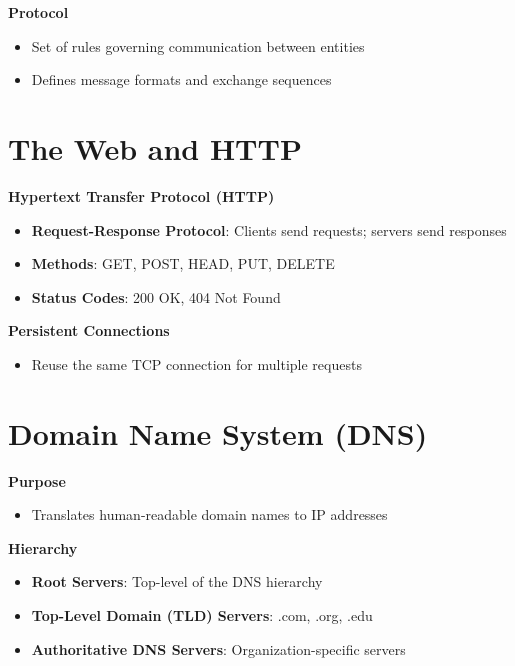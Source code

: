 \documentclass[9pt]{extarticle}
\begin{document}
\begin{multicols*}{3}
\textbf{Protocol}
\begin{itemize}
    \item Set of rules governing communication between entities
    \item Defines message formats and exchange sequences
\end{itemize}

{\color{sectioncolor}\section*{\centering The Web and HTTP}}
\textbf{Hypertext Transfer Protocol (HTTP)}
\begin{itemize}
    \item \textbf{Request-Response Protocol}: Clients send requests; servers send responses
    \item \textbf{Methods}: GET, POST, HEAD, PUT, DELETE
    \item \textbf{Status Codes}: 200 OK, 404 Not Found
\end{itemize}

\textbf{Persistent Connections}
\begin{itemize}
    \item Reuse the same TCP connection for multiple requests
\end{itemize}

{\color{sectioncolor}\section*{\centering Domain Name System (DNS)}}
\textbf{Purpose}
\begin{itemize}
    \item Translates human-readable domain names to IP addresses
\end{itemize}

\textbf{Hierarchy}
\begin{itemize}
    \item \textbf{Root Servers}: Top-level of the DNS hierarchy
    \item \textbf{Top-Level Domain (TLD) Servers}: .com, .org, .edu
    \item \textbf{Authoritative DNS Servers}: Organization-specific servers
\end{itemize}


\end{multicols*}
\end{document}
